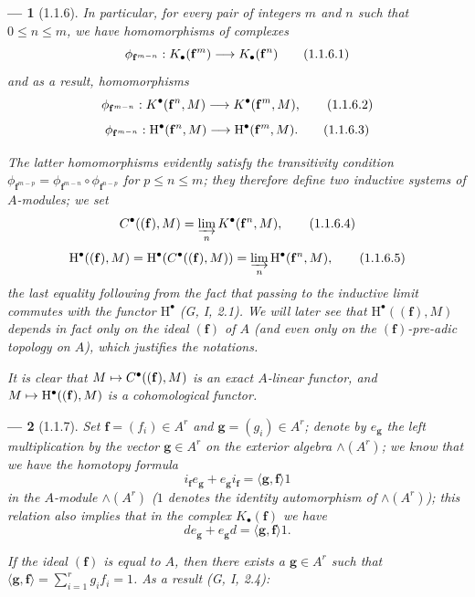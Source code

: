 \documentclass[oneside]{amsart}
\theoremstyle{ega-env-style}
\newtheorem*{env}{---}
\theoremstyle{ega-thm-env-style}
\theoremstyle{ega-defn-env-style}
\def\leq{\leqslant}                 %
\def\vphi{\phi}                     %
\def\HH{\mathrm{H}}                 %
\renewcommand{\to}{\mathchoice{\longrightarrow}{\rightarrow}{\rightarrow}{\rightarrow}}
\let\mapstoo\mapsto
\renewcommand{\mapsto}{\mathchoice{\longmapsto}{\mapstoo}{\mapstoo}{\mapstoo}}
\newcommand{\oldpage}[2][]{{\marginnote{\normalfont{\textbf{#1}~|~#2}}}\ignorespaces}
\let\EGAOriginalLabel\label
\renewcommand{\label}[1]{\phantomsection\EGAOriginalLabel{#1}}
\begin{document}
\begin{env}[1.1.6]
\label{III.1.1.6}
In particular, for every pair of integers $m$ and $n$ such that $0\leq n\leq m$, we have homomorphisms of complexes
\[
  \vphi_{\mathbf{f}^{m-n}}:K_\bullet(\mathbf{f}^m)\to K_\bullet(\mathbf{f}^n)
  \tag{1.1.6.1}
\]
and as a result, homomorphisms
\[
  \vphi_{\mathbf{f}^{m-n}}:K^\bullet(\mathbf{f}^n,M)\to K^\bullet(\mathbf{f}^m,M),
  \tag{1.1.6.2}
\]
\[
  \vphi_{\mathbf{f}^{m-n}}:\HH^\bullet(\mathbf{f}^n,M)\to\HH^\bullet(\mathbf{f}^m,M).
  \tag{1.1.6.3}
\]

\oldpage[III]{85}
The latter homomorphisms evidently satisfy the transitivity condition $\vphi_{\mathbf{f}^{m-p}}=\vphi_{\mathbf{f}^{m-n}}\circ\vphi_{\mathbf{f}^{n-p}}$ for $p\leq n\leq m$; they therefore define two \emph{inductive systems} of $A$-modules; we set
\[
  C^\bullet((\mathbf{f}),M)=\varinjlim_n K^\bullet(\mathbf{f}^n,M),
  \tag{1.1.6.4}
\]
\[
  \HH^\bullet((\mathbf{f}),M)=\HH^\bullet(C^\bullet((\mathbf{f}),M))=\varinjlim_n\HH^\bullet(\mathbf{f}^n,M),
  \tag{1.1.6.5}
\]
the last equality following from the fact that passing to the inductive limit commutes with the functor $\HH^\bullet$ (G, I, 2.1).
We will later see  that $\HH^\bullet((\mathbf{f}),M)$ depends in fact only on the \emph{ideal $(\mathbf{f})$} of $A$ (and even only on the $(\mathbf{f})$-pre-adic topology on $A$), which justifies the notations.

It is clear that $M\mapsto C^\bullet((\mathbf{f}),M)$ is an exact $A$-linear functor, and $M\mapsto\HH^\bullet((\mathbf{f}),M)$ is a cohomological functor.
\end{env}

\begin{env}[1.1.7]
\label{III.1.1.7}
Set $\mathbf{f}=(f_i)\in A^r$ and $\mathbf{g}=(g_i)\in A^r$; denote by $e_\mathbf{g}$ the left multiplication by the vector $\mathbf{g}\in A^r$ on the exterior algebra $\wedge(A^r)$; we know that we have the \emph{homotopy formula}
\[
  i_\mathbf{f}e_\mathbf{g}+e_\mathbf{g}i_\mathbf{f}=\langle\mathbf{g},\mathbf{f}\rangle 1
  \tag{1.1.7.1}
\]
in the $A$-module $\wedge(A^r)$ ($1$ denotes the identity automorphism of $\wedge(A^r)$); this relation also implies that \emph{in the complex $K_\bullet(\mathbf{f})$} we have
\[
  de_\mathbf{g}+e_\mathbf{g}d=\langle\mathbf{g},\mathbf{f}\rangle 1.
  \tag{1.1.7.2}
\]

If the ideal $(\mathbf{f})$ is equal to $A$, then there exists a $\mathbf{g}\in A^r$ such that $\langle\mathbf{g},\mathbf{f}\rangle=\sum_{i=1}^r g_i f_i=1$.
As a result (G, I, 2.4):
\end{env}
\end{document}
